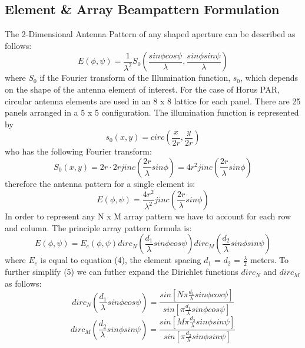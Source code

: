 \documentclass[conference]{IEEEtran}
\begin{document}
\subsection{Element \& Array Beampattern Formulation}
\par The 2-Dimensional Antenna Pattern of any shaped aperture can be described as follows:
\begin{equation}
    E(\phi,\psi) = \frac{1}{\lambda^2}S_0(\frac{sin\phi cos\psi}{\lambda}, \frac{sin\phi sin\psi}{\lambda})
\end{equation}
where \emph{$S_0$} if the Fourier transform of the Illumination function, \emph{$s_0$}, which depends on the shape of the antenna element of interest\cite{blahut}. For the case of Horus PAR, circular antenna elements are used in an 8 x 8 lattice for each panel. There are 25 panels arranged in a 5 x 5 configuration. The illumination function is represented by
\begin{equation}
    s_0(x,y) = circ(\frac{x}{2r}, \frac{y}{2r})
\end{equation}
who has the following Fourier transform:
\begin{equation}
    S_0(x,y) = 2r\cdot2rjinc(\frac{2r}{\lambda}sin\phi) = 4r^2jinc(\frac{2r}{\lambda}sin\phi) 
\end{equation}
therefore the antenna pattern for a single element is:
\begin{equation}
    E(\phi,\psi) = \frac{4r^2}{\lambda^2}jinc(\frac{2r}{\lambda}sin\phi) 
\end{equation}
In order to represent any N x M array pattern we have to account for each row and column. The principle array pattern formula is:
\begin{equation}
    E(\phi,\psi) = E_e(\phi,\psi)dirc_N(\frac{d_1}{\lambda}sin\phi cos\psi)dirc_M(\frac{d_2}{\lambda}sin\phi sin\psi)
\end{equation}
where \emph{$E_e$} is equal to equation (4), the element spacing \emph{$d_1$} = \emph{$d_2$} = $\frac{\lambda}{2}$ meters. To further simplify (5) we can futher expand the Dirichlet functions \emph{$dirc_N$} and \emph{$dirc_M$} as follows:
 \begin{equation}
    dirc_N(\frac{d_1}{\lambda}sin\phi cos\psi) = \frac{sin[N\pi\frac{d_1}{\lambda}sin\phi cos\psi]}{sin[\pi\frac{d_1}{\lambda}sin\phi cos\psi]}
\end{equation}
 \begin{equation}
    dirc_M(\frac{d_2}{\lambda}sin\phi sin\psi) = \frac{sin[M\pi\frac{d_2}{\lambda}sin\phi sin\psi]}{sin[\pi\frac{d_2}{\lambda}sin\phi sin\psi]}
\end{equation}
\end{document}

